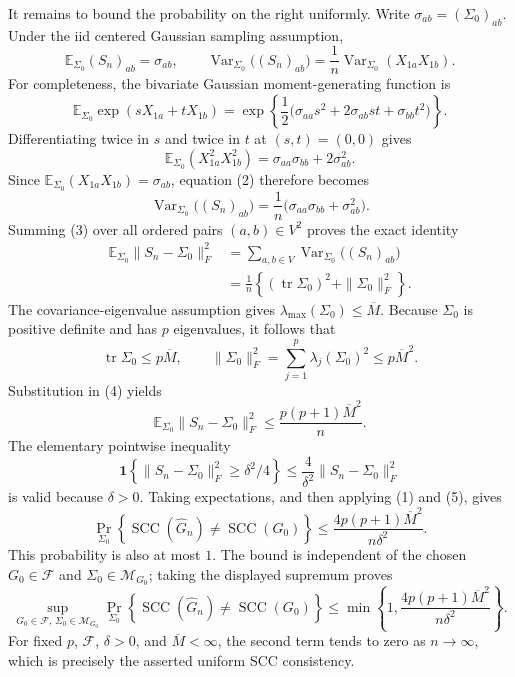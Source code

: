 It remains to bound the probability on the right uniformly.  Write \(\sigma_{ab}=(\Sigma_0)_{ab}\).  Under the iid centered Gaussian sampling assumption,
\[
\mathbb E_{\Sigma_0}(S_n)_{ab}=\sigma_{ab},\qquad
\operatorname{Var}_{\Sigma_0}\bigl((S_n)_{ab}\bigr)
=\frac1n\operatorname{Var}_{\Sigma_0}(X_{1a}X_{1b}).
\tag{2}
\]
For completeness, the bivariate Gaussian moment-generating function is
\[
\mathbb E_{\Sigma_0}\exp(sX_{1a}+tX_{1b})
=\exp\!\left\{\frac12\bigl(\sigma_{aa}s^2+2\sigma_{ab}st+\sigma_{bb}t^2\bigr)\right\}.
\]
Differentiating twice in \(s\) and twice in \(t\) at \((s,t)=(0,0)\) gives
\[
\mathbb E_{\Sigma_0}(X_{1a}^2X_{1b}^2)
=\sigma_{aa}\sigma_{bb}+2\sigma_{ab}^2.
\]
Since \(\mathbb E_{\Sigma_0}(X_{1a}X_{1b})=\sigma_{ab}\), equation (2) therefore becomes
\[
\operatorname{Var}_{\Sigma_0}\bigl((S_n)_{ab}\bigr)
=\frac1n\bigl(\sigma_{aa}\sigma_{bb}+\sigma_{ab}^2\bigr).
\tag{3}
\]
Summing (3) over all ordered pairs \((a,b)\in V^2\) proves the exact identity
\[
\begin{aligned}
\mathbb E_{\Sigma_0}\|S_n-\Sigma_0\|_F^2
&=\sum_{a,b\in V}\operatorname{Var}_{\Sigma_0}\bigl((S_n)_{ab}\bigr)\\
&=\frac1n\left\{\left(\operatorname{tr}\Sigma_0\right)^2+\|\Sigma_0\|_F^2\right\}.
\end{aligned}
\tag{4}
\]
The covariance-eigenvalue assumption gives \(\lambda_{\max}(\Sigma_0)\le\overline M\).  Because \(\Sigma_0\) is positive definite and has \(p\) eigenvalues, it follows that
\[
\operatorname{tr}\Sigma_0\le p\overline M,\qquad
\|\Sigma_0\|_F^2=\sum_{j=1}^p\lambda_j(\Sigma_0)^2\le p\overline M^2.
\]
Substitution in (4) yields
\[
\mathbb E_{\Sigma_0}\|S_n-\Sigma_0\|_F^2
\le \frac{p(p+1)\overline M^2}{n}.
\tag{5}
\]
The elementary pointwise inequality
\[
\mathbf 1\!\left\{\|S_n-\Sigma_0\|_F^2\ge\delta^2/4\right\}
\le \frac{4}{\delta^2}\|S_n-\Sigma_0\|_F^2
\]
is valid because \(\delta>0\).  Taking expectations, and then applying (1) and (5), gives
\[
\Pr_{\Sigma_0}\!\left\{\operatorname{SCC}(\widehat G_n)\ne\operatorname{SCC}(G_0)\right\}
\le \frac{4p(p+1)\overline M^2}{n\delta^2}.
\]
This probability is also at most \(1\).  The bound is independent of the chosen \(G_0\in\mathcal F\) and \(\Sigma_0\in\mathcal M_{G_0}\); taking the displayed supremum proves
\[
\sup_{G_0\in\mathcal F,\,\Sigma_0\in\mathcal M_{G_0}}
\Pr_{\Sigma_0}\!\left\{\operatorname{SCC}(\widehat G_n)\ne\operatorname{SCC}(G_0)\right\}
\le
\min\!\left\{1,\frac{4p(p+1)\overline M^2}{n\delta^2}\right\}.
\]
For fixed \(p\), \(\mathcal F\), \(\delta>0\), and \(\overline M<\infty\), the second term tends to zero as \(n\to\infty\), which is precisely the asserted uniform SCC consistency.

